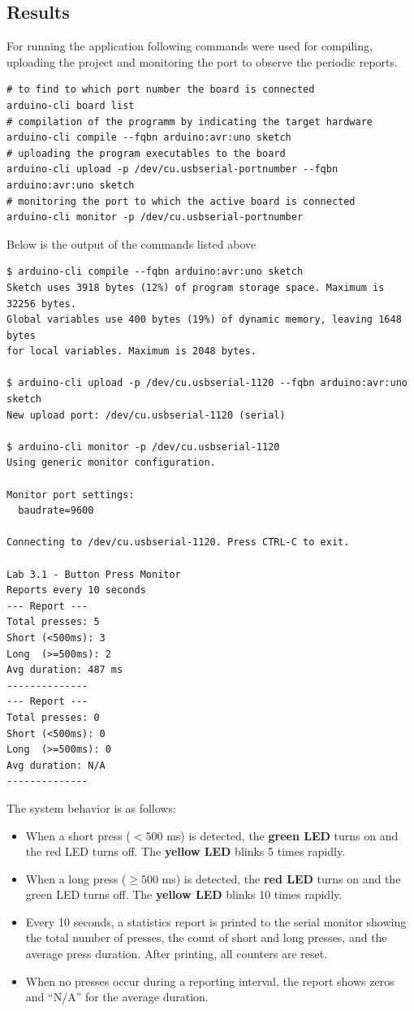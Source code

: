 \subsection{Results}

For running the application following commands were used for compiling,
uploading the project and monitoring the port to observe the periodic reports.

\begin{verbatim}
# to find to which port number the board is connected
arduino-cli board list
# compilation of the programm by indicating the target hardware
arduino-cli compile --fqbn arduino:avr:uno sketch
# uploading the program executables to the board
arduino-cli upload -p /dev/cu.usbserial-portnumber --fqbn arduino:avr:uno sketch
# monitoring the port to which the active board is connected
arduino-cli monitor -p /dev/cu.usbserial-portnumber
\end{verbatim}

Below is the output of the commands listed above

\begin{verbatim}
$ arduino-cli compile --fqbn arduino:avr:uno sketch
Sketch uses 3918 bytes (12%) of program storage space. Maximum is 32256 bytes.
Global variables use 400 bytes (19%) of dynamic memory, leaving 1648 bytes
for local variables. Maximum is 2048 bytes.

$ arduino-cli upload -p /dev/cu.usbserial-1120 --fqbn arduino:avr:uno sketch
New upload port: /dev/cu.usbserial-1120 (serial)

$ arduino-cli monitor -p /dev/cu.usbserial-1120
Using generic monitor configuration.

Monitor port settings:
  baudrate=9600

Connecting to /dev/cu.usbserial-1120. Press CTRL-C to exit.

Lab 3.1 - Button Press Monitor
Reports every 10 seconds
--- Report ---
Total presses: 5
Short (<500ms): 3
Long  (>=500ms): 2
Avg duration: 487 ms
--------------
--- Report ---
Total presses: 0
Short (<500ms): 0
Long  (>=500ms): 0
Avg duration: N/A
--------------
\end{verbatim}

The system behavior is as follows:
\begin{itemize}
  \item When a short press ($< 500$ ms) is detected, the \textbf{green LED} turns on and the
    red LED turns off. The \textbf{yellow LED} blinks 5 times rapidly.
  \item When a long press ($\geq 500$ ms) is detected, the \textbf{red LED} turns on and the
    green LED turns off. The \textbf{yellow LED} blinks 10 times rapidly.
  \item Every 10 seconds, a statistics report is printed to the serial monitor showing the
    total number of presses, the count of short and long presses, and the average press duration.
    After printing, all counters are reset.
  \item When no presses occur during a reporting interval, the report shows zeros and
    ``N/A'' for the average duration.
\end{itemize}


